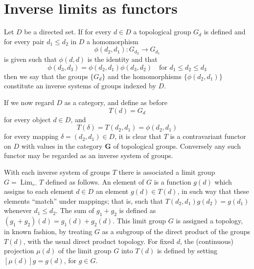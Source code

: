 \documentclass[11pt,a4paper]{report}
\DeclareMathOperator{\Lim}{Lim}
\begin{document}
\section{Inverse limits as functors}\label{sec:inv_lim}
Let $D$ be a directed set. If for every $d\in D$ a topological group $G_d$ is defined and for every pair $d_1\le d_2$ in $D$ a
homomorphism
\begin{equation}\label{eq:inv-lim1}
	\phi(d_2,d_1):G_{d_2}\rightarrow G_{d_1}
\end{equation}
is given such that $\phi(d,d)$ is the identity and that
\begin{equation}\label{eq:inv-lim2}
	\phi(d_3,d_3)=\phi(d_2,d_1)\phi(d_3,d_2)\quad\text{for } d_1\le d_2\le d_3
\end{equation}
then we say that the groups $\{G_d\}$ and the homomorphisms $\{\phi(d_2,d_1)\}$ constitute an inverse systems of groups indexed by $D$.

If we now regard $D$ as a category, and define as before
\begin{equation}\label{eq:inv-func}
	T(d)= G_d
\end{equation}
for every object $d\in D$, and
\begin{equation}\label{eq:inv-func2}
	T(\delta)=T(d_2,d_1)=\phi(d_2,d_1)
\end{equation}
for every mapping $\delta=(d_2,d_1)\in D$, it is clear that $T$ is a contravariant functor on $D$ with values in the category $\mathbf{G}$
of topological groups. Conversely any such functor may be regarded as an inverse system of groups.

With each inverse system of groups $T$ there is associated a limit group $G=\Lim_{\leftarrow} T$ defined as follows. An element of $G$
is a function $g(d)$ which assigns to each element $d\in D$ an element $g(d)\in T(d)$, in such way that these elements ``match'' under
mappings; that is, such that $T(d_2,d_1)g(d_2)=g(d_1)$ whenever $d_1\le d_2$. The sum of $g_1+g_2$ is defined as $(g_1+g_2)(d)=
g_1(d)+g_2(d)$. This limit group $G$ is assigned a topology, in known fashion, by treating $G$ as a subgroup of the direct product of the
groups $T(d)$, with the usual direct product topology. For fixed $d$, the (continuous) projection $\mu(d)$ of the limit group $G$ into
$T(d)$ is defined by setting $[\mu(d)]g= g(d)$, for $g\in G$.
\end{document}
